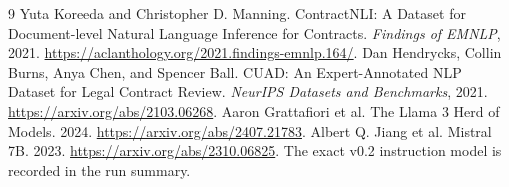 \documentclass{article}
\begin{document}
\begin{thebibliography}{9}
Yuta Koreeda and Christopher D. Manning. ContractNLI: A Dataset for Document-level Natural Language Inference for Contracts. \emph{Findings of EMNLP}, 2021. \url{https://aclanthology.org/2021.findings-emnlp.164/}.
Dan Hendrycks, Collin Burns, Anya Chen, and Spencer Ball. CUAD: An Expert-Annotated NLP Dataset for Legal Contract Review. \emph{NeurIPS Datasets and Benchmarks}, 2021. \url{https://arxiv.org/abs/2103.06268}.
Aaron Grattafiori et al. The Llama 3 Herd of Models. 2024. \url{https://arxiv.org/abs/2407.21783}.
Albert Q. Jiang et al. Mistral 7B. 2023. \url{https://arxiv.org/abs/2310.06825}. The exact v0.2 instruction model is recorded in the run summary.
\end{thebibliography}
\end{document}
